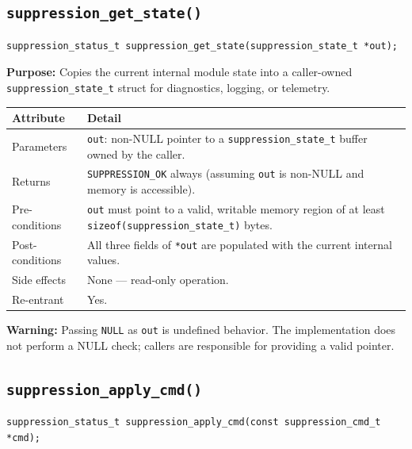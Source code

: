 \documentclass[12pt]{article}
\begin{document}
\subsection{\texttt{suppression\_get\_state()}}

\begin{lstlisting}[style=cstyle, numbers=none]
suppression_status_t suppression_get_state(suppression_state_t *out);
\end{lstlisting}

\textbf{Purpose:} Copies the current internal module state into a caller-owned \texttt{suppression\_state\_t} struct for diagnostics, logging, or telemetry.

\begin{table}[H]
\centering\small
\begin{tabularx}{\textwidth}{L{3.5cm} X}
\toprule
\textbf{Attribute} & \textbf{Detail} \\
\midrule
Parameters & \texttt{out}: non-NULL pointer to a \texttt{suppression\_state\_t} buffer owned by the caller. \\
Returns & \texttt{SUPPRESSION\_OK} always (assuming \texttt{out} is non-NULL and memory is accessible). \\
Pre-conditions & \texttt{out} must point to a valid, writable memory region of at least \texttt{sizeof(suppression\_state\_t)} bytes. \\
Post-conditions & All three fields of \texttt{*out} are populated with the current internal values. \\
Side effects & None --- read-only operation. \\
Re-entrant & Yes. \\
\bottomrule
\end{tabularx}
\end{table}

\begin{warnbox}
\textbf{Warning:} Passing \texttt{NULL} as \texttt{out} is undefined behavior. The implementation does not perform a NULL check; callers are responsible for providing a valid pointer.
\end{warnbox}

\subsection{\texttt{suppression\_apply\_cmd()}}

\begin{lstlisting}[style=cstyle, numbers=none]
suppression_status_t suppression_apply_cmd(const suppression_cmd_t *cmd);
\end{lstlisting}
\end{document}

